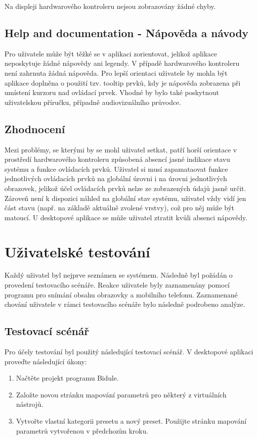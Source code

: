 \documentclass[thesis=M,czech]{FITthesis}[2019/03/06]
\begin{document}
			Na displeji hardwarového kontroleru nejsou zobrazovány žádné chyby.

		\subsection{Help and documentation - Nápověda a návody}
			Pro uživatele může být těžké se v aplikaci zorientovat, jelikož aplikace neposkytuje žádné nápovědy ani legendy. V případě hardwarového kontroleru není zahrnuta žádná nápověda. 
			Pro lepší orientaci uživatele by mohla být aplikace doplněna o použití tzv. tooltip prvků, kdy je nápověda zobrazena při umístení kurzoru nad ovládací prvek.
			Vhodné by bylo také poskytnout uživatelskou příručku, případně audiovizuálního průvodce.
			
		\subsection{Zhodnocení}
			Mezi problémy, se kterými by se mohl uživatel setkat, patří horší orientace v prostředí hardwarového kontroleru způsobená
			 absencí jasné indikace stavu systému a funkce ovládacích prvků. Uživatel si musí zapamataovat funkce jednotlivých ovládacích prvků na globální úrovni i na úrovni jednotlivých obrazovek, jelikož účel ovládacích prvků nelze ze zobrazených údajů jasně určit.
			Zároveň není k dispozici náhled na globální stav systému, uživatel vždy vidí jen část stavu (např. na základě aktuálně zvolené vrstvy), což pro něj může být matoucí.
			U desktopové aplikace se může uživatel ztratit kvůli absenci nápovědy.
		
	\section{Uživatelské testování}
		Každý uživatel byl nejprve seznámen se systémem. Následně byl požádán o provedení testovacího scénáře. Reakce uživatele byly zaznamenány pomocí programu pro snímání obsahu obrazovky a mobilního telefonu. Zaznamenané chování uživatele v rámci testovacího scénáře bylo následně podrobeno analýze.
	
		\subsection{Testovací scénář}
			Pro účely testování byl použitý následující testovací scénář.
			\bigbreak
			\noindent 
			V desktopové aplikaci proveďte následující úkony:
			\begin{enumerate}
				\item Načtěte projekt programu Bidule.
				\item Založte novou stránku mapování parametrů pro některý z virtuálních nástrojů.
				\item Vytvořte vlastní kategorii presetu a nový preset. Použijte stránku mapování parametrů vytvořenou v předchozím kroku.
			\end{enumerate}
				
\end{document}
